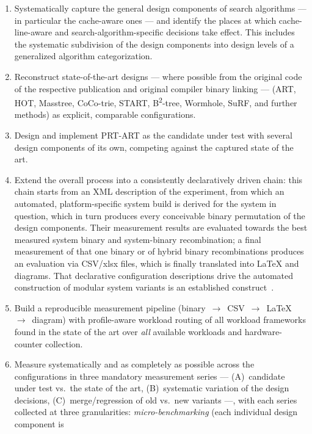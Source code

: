 \begin{enumerate}
  \item Systematically capture the general design components of search algorithms --- in particular
  the cache-aware ones --- and identify the places at which cache-line-aware and
  search-algorithm-specific decisions take effect. This includes the systematic subdivision of the
  design components into design levels of a generalized algorithm categorization.
  \item Reconstruct state-of-the-art designs --- where possible from the original code of the
  respective publication and original compiler binary linking --- (ART, HOT, Masstree, CoCo-trie, START, B\textsuperscript{2}-tree,
  Wormhole, SuRF, and further methods) as explicit, comparable configurations.
  \item Design and implement PRT-ART as the candidate under test with several design components of its own, competing
  against the captured state of the art.
  \item Extend the overall process into a consistently declaratively driven chain: this chain starts
  from an XML description of the experiment, from which an automated, platform-specific system build
  is derived for the system in question, which in turn produces every conceivable binary permutation
  of the design components. Their measurement results are evaluated towards the best measured system
  binary and system-binary recombination; a final measurement of that one binary or of hybrid binary
  recombinations produces an evaluation via CSV/xlsx files, which is finally translated into LaTeX
  and diagrams. That declarative configuration descriptions drive the automated construction of
  modular system variants is an established construct~\cite{czarnecki2000generative, apel2013feature}.
  \item Build a reproducible measurement pipeline (binary~$\to$~CSV~$\to$~LaTeX~$\to$~diagram) with
  profile-aware workload routing of all workload frameworks found in the state of the art over
  \emph{all} available workloads and hardware-counter collection.
  \item Measure systematically and as completely as possible across the configurations in three
  mandatory measurement series --- (A)~candidate under test vs.\ the state of the art, (B)~systematic variation of
  the design decisions, (C)~merge/regression of old vs.\ new variants ---, with each series
  collected at three granularities: \emph{micro-benchmarking} (each individual design component is

\end{enumerate}
